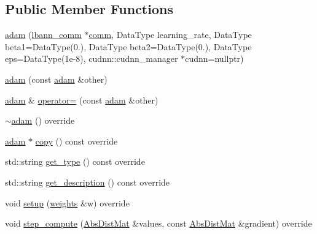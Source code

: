 \subsection*{Public Member Functions}
\begin{DoxyCompactItemize}
\item 
\hyperlink{classlbann_1_1adam_a9d6848fa245bc2adfe142ae3aeb4e33d}{adam} (\hyperlink{classlbann_1_1lbann__comm}{lbann\+\_\+comm} $\ast$\hyperlink{file__io_8cpp_ab048c6f9fcbcfaa57ce68b00263dbebe}{comm}, Data\+Type learning\+\_\+rate, Data\+Type beta1=Data\+Type(0.), Data\+Type beta2=Data\+Type(0.), Data\+Type eps=Data\+Type(1e-\/8), cudnn\+::cudnn\+\_\+manager $\ast$cudnn=nullptr)
\item 
\hyperlink{classlbann_1_1adam_a77464b030ec2be620155eff22acdff76}{adam} (const \hyperlink{classlbann_1_1adam}{adam} \&other)
\item 
\hyperlink{classlbann_1_1adam}{adam} \& \hyperlink{classlbann_1_1adam_a00051b788b2bb34102a6bad5a380fc85}{operator=} (const \hyperlink{classlbann_1_1adam}{adam} \&other)
\item 
\hyperlink{classlbann_1_1adam_a5ab2783191786e2c9c1c71d6edecfb2e}{$\sim$adam} () override
\item 
\hyperlink{classlbann_1_1adam}{adam} $\ast$ \hyperlink{classlbann_1_1adam_a95866f94044a4e7bb34bf35551ade4cc}{copy} () const override
\item 
std\+::string \hyperlink{classlbann_1_1adam_a091b61b0125d2da89d4029dd30ca1ce7}{get\+\_\+type} () const override
\item 
std\+::string \hyperlink{classlbann_1_1adam_a14eb9754e2aa38a732d92b6d42311676}{get\+\_\+description} () const override
\item 
void \hyperlink{classlbann_1_1adam_aea0b1fa44197fe184a6feca5ec5c808e}{setup} (\hyperlink{classlbann_1_1weights}{weights} \&w) override
\item 
void \hyperlink{classlbann_1_1adam_a3bcd1bcbbed2b99c407eb0cd9fd6d449}{step\+\_\+compute} (\hyperlink{base_8hpp_a9a697a504ae84010e7439ffec862b470}{Abs\+Dist\+Mat} \&values, const \hyperlink{base_8hpp_a9a697a504ae84010e7439ffec862b470}{Abs\+Dist\+Mat} \&gradient) override
\end{DoxyCompactItemize}
